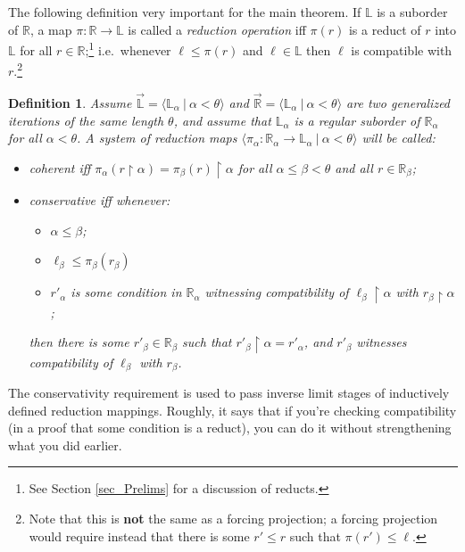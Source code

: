 \documentclass{amsart}
\newtheorem{definition}[theorem]{Definition}
\begin{document}
The following definition very important for the main theorem.  If $\mathbb{L}$ is a suborder of $\mathbb{R}$, a map $\pi: \mathbb{R} \to \mathbb{L}$ is called a \emph{reduction operation} iff $\pi(r)$ is a reduct of $r$ into $\mathbb{L}$ for all $r \in \mathbb{R}$;\footnote{See Section \ref{sec_Prelims} for a discussion of reducts.} i.e.\ whenever $\ell \le \pi(r)$ and $\ell \in \mathbb{L}$ then $\ell$ is compatible with $r$.\footnote{Note that this is \textbf{not} the same as a forcing projection; a forcing projection would require instead that there is some $r' \le r$ such that $\pi(r') \le \ell$.}
\begin{definition}\label{def_ConservCoherent}
Assume $\vec{\mathbb{L}} = \langle \mathbb{L}_\alpha \ | \ \alpha < \theta \rangle$ and $\vec{\mathbb{R}} = \langle \mathbb{L}_\alpha \ | \ \alpha < \theta \rangle$ are two generalized iterations of the same length $\theta$, and assume that $\mathbb{L}_\alpha$ is a regular suborder of $\mathbb{R}_\alpha$ for all $\alpha < \theta$.  A system of reduction maps $\langle \pi_\alpha: \mathbb{R}_\alpha \to \mathbb{L}_\alpha \ | \ \alpha < \theta \rangle$ will be called:
\begin{itemize}
 \item \emph{coherent} iff $\pi_\alpha(r \restriction \alpha) = \pi_\beta(r) \restriction \alpha$ for all $\alpha \le \beta < \theta$ and all $r \in \mathbb{R}_\beta$;
 \item \emph{conservative} iff whenever:
 \begin{itemize}
  \item $\alpha \le \beta$;
  \item $\ell_\beta \le \pi_\beta(r_\beta)$
  \item $r'_\alpha$ is some condition in $\mathbb{R}_\alpha$ witnessing compatibility of $\ell_\beta \restriction \alpha$ with $r_\beta \restriction \alpha$;  
 \end{itemize}
 then there is some $r'_\beta \in \mathbb{R}_\beta$ such that $r'_\beta \restriction \alpha = r'_\alpha$, and $r'_\beta$ witnesses compatibility of $\ell_\beta$ with $r_\beta$.
\end{itemize}
\end{definition}

The conservativity requirement is used to pass inverse limit stages of inductively defined reduction mappings.  Roughly, it says that if you're checking compatibility (in a proof that some condition is a reduct), you can do it without strengthening what you did earlier.
\end{document}

